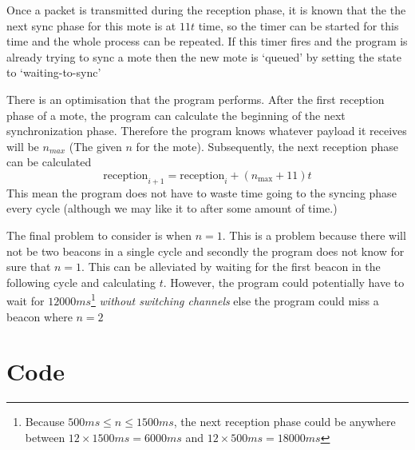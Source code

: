 \documentclass{report}
\newcommand{\reception}[1]{\text{reception}_{#1}}
\begin{document}
Once a packet is transmitted during the reception phase, it is known that the the next sync phase for this mote is at $11 t$ time, so the timer can be started for this time and the whole process can be repeated. If this timer fires and the program is already trying to sync a mote then the new mote is `queued' by setting the state to `waiting-to-sync'

There is an optimisation that the program performs. After the first reception phase of a mote, the program can calculate the beginning of the next synchronization phase. Therefore the program knows whatever payload it receives will be $n_{max}$ (The given $n$ for the mote). Subsequently, the next reception phase can be calculated
\[\reception{i+1} = \reception{i} + (n_{\text{max}} + 11) t\]
This mean the program does not have to waste time going to the syncing phase every cycle (although we may like it to after some amount of time.)

The final problem to consider is when $n = 1$. This is a problem because there will not be two beacons in a single cycle and secondly the program does not know for sure that $n = 1$. This can be alleviated by waiting for the first beacon in the following cycle and calculating $t$. However, the program could potentially have to wait for $12000ms$\footnote{Because $500ms \leq n \leq 1500ms$, the next reception phase could be anywhere between $12 \times 1500ms = 6000ms$ and $12 \times 500ms = 18000ms$} \emph{without switching channels} else the program could miss a beacon where $n = 2$



\section{Code}


\end{document}
